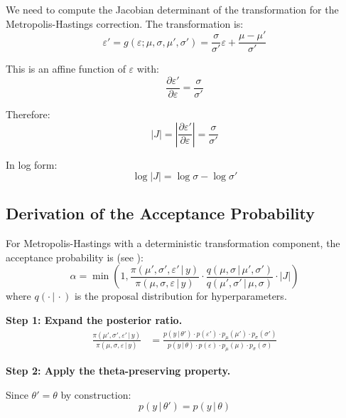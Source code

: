 \documentclass[11pt,a4paper]{article}
\theoremstyle{definition}
\newcommand{\eps}{\varepsilon}
\newcommand{\given}{\,|\,}
\begin{document}
We need to compute the Jacobian determinant of the transformation for the
Metropolis-Hastings correction. The transformation is:
\begin{equation}
    \eps' = g(\eps; \mu, \sigma, \mu', \sigma') = \frac{\sigma}{\sigma'} \eps + \frac{\mu - \mu'}{\sigma'}
\end{equation}

This is an affine function of $\eps$ with:
\begin{equation}
    \frac{\partial \eps'}{\partial \eps} = \frac{\sigma}{\sigma'}
\end{equation}

Therefore:
\begin{equation}
    \boxed{|J| = \left| \frac{\partial \eps'}{\partial \eps} \right| = \frac{\sigma}{\sigma'}}
    \label{eq:jacobian_single}
\end{equation}

In log form:
\begin{equation}
    \log |J| = \log \sigma - \log \sigma'
\end{equation}

\subsection{Derivation of the Acceptance Probability}

For Metropolis-Hastings with a deterministic transformation component, the acceptance
probability is (see \cite{Green1995}):
\begin{equation}
    \alpha = \min\left(1, \frac{\pi(\mu', \sigma', \eps' \given y)}{\pi(\mu, \sigma, \eps \given y)}
    \cdot \frac{q(\mu, \sigma \given \mu', \sigma')}{q(\mu', \sigma' \given \mu, \sigma)}
    \cdot |J| \right)
    \label{eq:mh_ratio}
\end{equation}
where $q(\cdot \given \cdot)$ is the proposal distribution for hyperparameters.

\textbf{Step 1: Expand the posterior ratio.}
\begin{align}
    \frac{\pi(\mu', \sigma', \eps' \given y)}{\pi(\mu, \sigma, \eps \given y)}
    &= \frac{p(y \given \theta') \cdot p(\eps') \cdot p_\mu(\mu') \cdot p_\sigma(\sigma')}
           {p(y \given \theta) \cdot p(\eps) \cdot p_\mu(\mu) \cdot p_\sigma(\sigma)}
\end{align}

\textbf{Step 2: Apply the theta-preserving property.}

Since $\theta' = \theta$ by construction:
\begin{equation}
    p(y \given \theta') = p(y \given \theta)
\end{equation}
\end{document}
